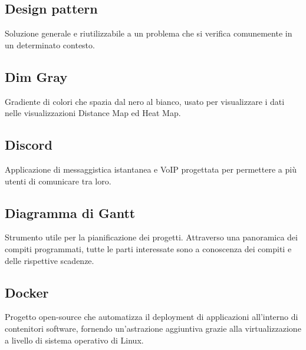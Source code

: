 \documentclass[../glossario.tex]{subfiles}
\begin{document}
\subsection*{Design pattern}
{}
Soluzione generale e riutilizzabile a un problema che si verifica comunemente in un determinato contesto.

\subsection*{Dim Gray}
{}
Gradiente di colori che spazia dal nero al bianco, usato per visualizzare i dati nelle visualizzazioni Distance Map ed Heat Map.

\subsection*{Discord}
{}
Applicazione di messaggistica istantanea e VoIP progettata per permettere a più utenti di comunicare tra loro.


\subsection*{Diagramma di Gantt}
{}
Strumento utile per la pianificazione dei progetti. Attraverso una panoramica dei compiti programmati, tutte le parti interessate sono a conoscenza dei compiti e delle rispettive scadenze.

\subsection*{Docker}
{}
Progetto open-source che automatizza il deployment di applicazioni all'interno di contenitori software, fornendo un'astrazione aggiuntiva grazie alla virtualizzazione a livello di sistema operativo di Linux.
\end{document}
